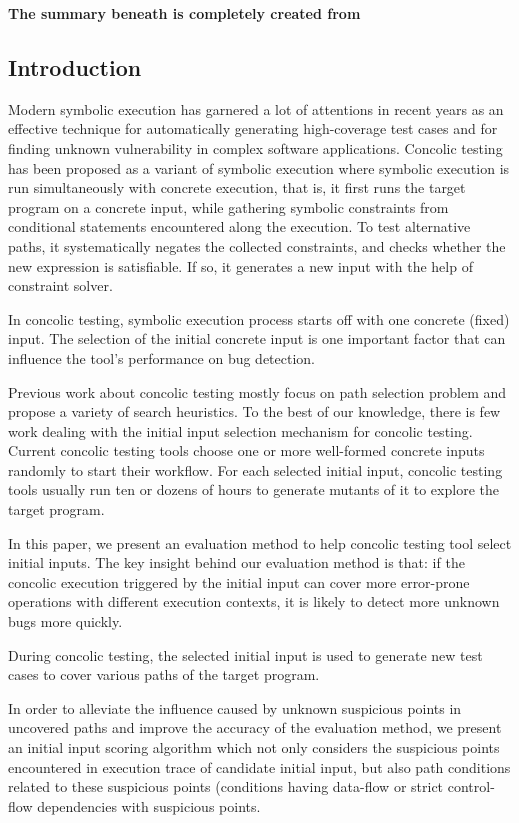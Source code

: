 \textbf{The summary beneath is completely created from \cite{wang2015evaluating}}
\\
\subsection{Introduction}
Modern symbolic execution has garnered a lot of attentions in recent years as an effective technique for automatically generating high-coverage test cases and for finding unknown vulnerability in complex software applications.
Concolic testing has been proposed as a variant of symbolic execution where symbolic execution is run simultaneously with concrete execution, that is, it first runs the target program on a concrete input, while gathering symbolic constraints from conditional statements encountered along the execution. 
To test alternative paths, it systematically negates the collected constraints, and checks whether the new expression is satisfiable. If so, it generates a new input with the help of constraint solver.

In concolic testing, symbolic execution process starts off with one concrete (fixed) input. The selection of the initial concrete input is one important factor that can influence the tool’s performance on bug detection.

Previous work about concolic testing mostly focus on path selection problem and propose a variety of search heuristics.
To the best of our knowledge, there is few work dealing with the initial input selection mechanism for concolic testing. Current concolic testing tools choose one or more well-formed concrete inputs randomly to start their workflow. 
For each selected initial input, concolic testing tools usually run ten or dozens of hours to generate mutants of it to explore the target program.

In this paper, we present an evaluation method to help concolic testing tool select initial inputs. 
The key insight behind our evaluation method is that: if the concolic execution triggered by the initial input can cover more error-prone operations with different execution contexts, it is likely to detect more unknown bugs more quickly.

During concolic testing, the selected initial input is used to generate new test cases to cover various paths of the target program.

In order to alleviate the influence caused by unknown suspicious points in uncovered paths and improve the accuracy of the evaluation method, we present an initial input scoring algorithm which not only considers the suspicious points encountered in execution trace of candidate initial input, but also path conditions related to these suspicious points (conditions having data-flow or strict control-flow dependencies with suspicious points.

